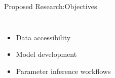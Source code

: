 \documentclass{beamer}
\begin{document}
\begin{frame}{Proposed Research:Objectives}
    \begin{columns}[c] %
    \begin{itemize}
		\item Data accessibility 
    \item Model development
	\item Parameter inference workflows
    \end{itemize}
    

\end{columns}
\end{frame}
\end{document}
